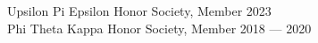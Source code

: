 Upsilon Pi Epsilon Honor Society, Member \hfill 2023 \\
Phi Theta Kappa Honor Society, Member	\hfill 2018 --- 2020
 

